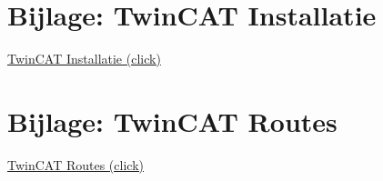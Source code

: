 \appendix

\section{Bijlage: \gls{TwinCAT} Installatie} \label{sec:TwinCATInstallatie}

\href{https://infosys.beckhoff.com/english.php?content=../content/1033/tc3_installation/179470219.html&id=}{TwinCAT Installatie (click)}

\section{Bijlage: \gls{TwinCAT} Routes} \label{sec:TwinCATRoutes}

\href{https://infosys.beckhoff.com/english.php?content=../content/1033/tc3_system/5211773067.html&id=}{TwinCAT Routes (click)}